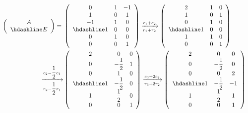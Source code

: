 \documentclass[UTF8,12pt,a4paper,fontset=fandol]{ctexart}
\begin{document}
\begin{solve}
    \begin{align*}
        \left(\begin{array}{c}
            A \\ \hdashline E
        \end{array}\right) ={} & \left(\begin{array}{ccc}
            0 & 1 & -1 \\
            1 & 0 & 1  \\
            -1 & 1 & 0 \\
            \hdashline
            1 & 0 & 0 \\
            0 & 1 & 0 \\
            0 & 0 & 1
        \end{array}\right)
        \xrightarrow[r_1+r_2]{c_1+c_2} \left(\begin{array}{ccc}
            2 & 1 & 0 \\
            1 & 0 & 1  \\
            0 & 1 & 0 \\
            \hdashline
            1 & 0 & 0 \\
            1 & 1 & 0 \\
            0 & 0 & 1
        \end{array}\right) & \\
        \xrightarrow[r_2-\dfrac{1}{2}r_1]{c_2-\dfrac{1}{2}c_1} & \left(\begin{array}{ccc}
            2 & 0 & 0 \\
            0 & -\dfrac{1}{2} & 1  \\
            0 & 1 & 0 \\
            \hdashline
            1 & -\dfrac{1}{2} & 0 \\
            1 & \dfrac{1}{2} & 0 \\
            0 & 0 & 1
        \end{array}\right)
        \xrightarrow[r_3+2r_2]{c_3+2c_2} \left(\begin{array}{ccc}
            2 & 0 & 0 \\
            0 & -\dfrac{1}{2} & 0  \\
            0 & 0 & 2 \\
            \hdashline
            1 & -\dfrac{1}{2} & -1 \\
            1 & \dfrac{1}{2} & 1 \\
            0 & 0 & 1
        \end{array}\right) & \\
    \end{align*}
\end{solve}
\end{document}
